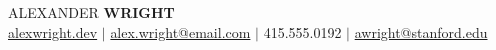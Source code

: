 \documentclass[letterpaper,10pt]{article}
\begin{document}
\color{primarytext}

\begin{center}
    {\Huge ALEXANDER} {\Huge\bfseries WRIGHT} \\ \vspace{3pt}
    \color{graytext} \small
    \href{https://alexwright.dev}{alexwright.dev} $|$
    \href{mailto:alex.wright@email.com}{alex.wright@email.com} $|$
    415.555.0192 $|$
    \href{mailto:awright@stanford.edu}{awright@stanford.edu}
\end{center}
\vspace{4pt}

\setlength{\columnsep}{20pt}
\end{document}
